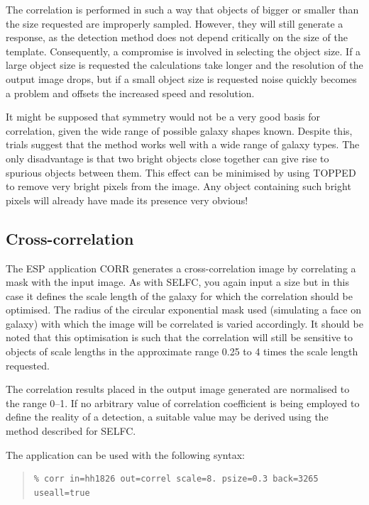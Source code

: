 \documentclass[twoside,11pt]{article}
\newenvironment{myquote}{\begin{quote}\begin{small}}{\end{small}\end{quote}}
\begin{document}
The correlation is performed in such a way that objects of
bigger or smaller than the size requested are improperly sampled. However,
they will still generate a response, as the detection method does not depend
critically on the size of the template. Consequently, a compromise is
involved in selecting the object size. If a large object size is requested
the calculations take longer and the resolution of the output image drops,
but if a small object size is requested noise quickly
becomes a problem and offsets the increased speed and resolution.

It might be supposed that symmetry would not be a very good basis for correlation,
given the wide range of possible galaxy shapes known. Despite this,
trials suggest that the method works well with a wide range of galaxy
types. The only disadvantage is that two bright objects close together can
give rise to spurious objects between them. This effect can be minimised by
using TOPPED to remove very bright pixels from the image. Any object containing
such bright pixels will already have made its presence very obvious!

\subsection{Cross-correlation}

The ESP application CORR generates a cross-correlation image by correlating
a mask with the input image. As with SELFC, you again input a size but in
this case it defines the scale length of the galaxy for which the correlation
should be optimised. The radius of the circular exponential mask used
(simulating a face on galaxy) with which the image will be correlated
is varied accordingly. It should be noted that this optimisation is such that
the correlation will still be sensitive to objects of scale lengths in the
approximate range 0.25 to 4 times the scale length requested.

The correlation results placed in the output image generated are
normalised to the range 0--1. If no arbitrary value
of correlation coefficient is being employed to define the reality of a detection,
a suitable value may be derived using the method described for SELFC.

The application can be used with the following syntax:

\begin{myquote}
\begin{verbatim}
% corr in=hh1826 out=correl scale=8. psize=0.3 back=3265 useall=true
\end{verbatim}
\end{myquote}
\end{document}
